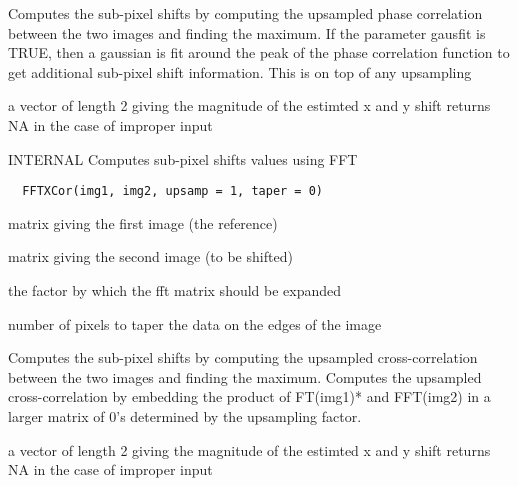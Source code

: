 \documentclass[a4paper]{book}
\begin{document}
%
\begin{Details}\relax
Computes the sub-pixel shifts by computing the upsampled
phase correlation between the two images and finding the
maximum.  If the parameter gausfit is TRUE, then a
gaussian is fit around the peak of the phase correlation
function to get additional sub-pixel shift information.
This is on top of any upsampling
\end{Details}
%
\begin{Value}
a vector of length 2 giving the magnitude of the estimted
x and y shift returns NA in the case of improper input
\end{Value}
%
\begin{Description}\relax
INTERNAL Computes sub-pixel shifts values using FFT
\end{Description}
%
\begin{Usage}
\begin{verbatim}
  FFTXCor(img1, img2, upsamp = 1, taper = 0)
\end{verbatim}
\end{Usage}
%
\begin{Arguments}
\begin{ldescription}
\item[\code{img1}] matrix giving the first image (the
reference)

\item[\code{img2}] matrix giving the second image (to be
shifted)

\item[\code{upsamp}] the factor by which the fft matrix should
be expanded

\item[\code{taper}] number of pixels to taper the data on the
edges of the image
\end{ldescription}
\end{Arguments}
%
\begin{Details}\relax
Computes the sub-pixel shifts by computing the upsampled
cross-correlation between the two images and finding the
maximum. Computes the upsampled cross-correlation by
embedding the product of FT(img1)* and FFT(img2) in a
larger matrix of 0's determined by the upsampling factor.
\end{Details}
%
\begin{Value}
a vector of length 2 giving the magnitude of the estimted
x and y shift returns NA in the case of improper input
\end{Value}
\end{document}
